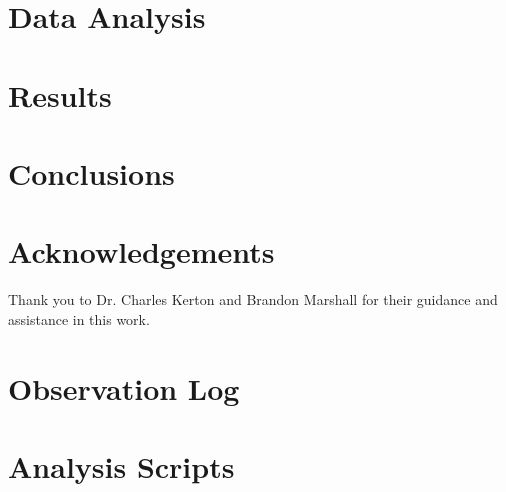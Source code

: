 \documentclass[%
aip,
jmp,
reprint,
]{revtex4-1}
\begin{document}
	\section{Data Analysis}
	


	
	\section{Results}
	 
	
	
	\section{Conclusions}
	
	
	
	\section*{Acknowledgements}
	
	Thank you to Dr. Charles Kerton and Brandon Marshall for their guidance and assistance in this work.
	
	
	
	
	\onecolumngrid
	\appendix
	\section{Observation Log}

	\begin{table}[h!]
		\centering
		\label{table:log}
		
	\end{table}
	
	\section{Analysis Scripts}
	
	
\end{document}
